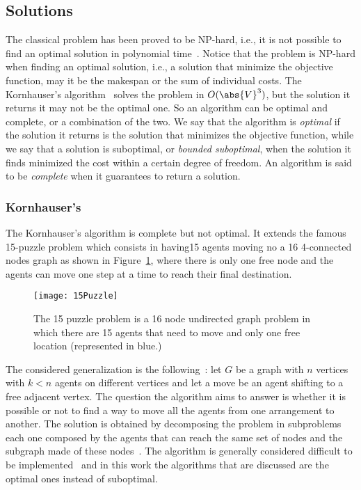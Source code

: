 \subsection{Solutions}
The classical  problem has been proved to be NP-hard, i.e., it is 
not possible to find an optimal solution in polynomial
time~\cite{lavalle,MAPFNPHARD,MAPFIntractable}. Notice that the problem is
NP-hard when finding an optimal solution, i.e., a solution that minimize the
objective function, may it be the makespan or the sum of individual costs. The
Kornhauser's algorithm~\cite{kornhauser} solves the  problem in
$O(\abs{V}^3)$, but the solution it returns it may not be the optimal one.
\newline
So an algorithm can be optimal and complete, or a combination of the two. We
say that the algorithm is \textit{optimal} if the solution it returns is the 
solution that minimizes the objective function, while we say that a solution is
suboptimal, or \textit{bounded suboptimal}, when the solution it finds 
minimized the cost within a certain degree of freedom. An algorithm is said to 
be \textit{complete} when it guarantees to return a solution.
%
\subsubsection{Kornhauser's}
The Kornhauser's algorithm is complete but not optimal. It extends the famous
15-puzzle problem which consists in having15 agents moving no a 16 4-connected
nodes graph as shown in Figure~\ref{fig:15Puzzle}, where there is only one free
node and the agents can move one step at a time to reach their final
destination.
\begin{figure}[t]
  \centering
  \texttt{[image: 15Puzzle]}
  \caption{The 15 puzzle problem is a 16 node undirected graph problem in which
  there are 15 agents that need to move and only one free location
  (represented in blue.)}
  \label{fig:15Puzzle}
\end{figure}\newline
The considered generalization is the following~\cite{kornhauser}: let $G$ be a 
graph with $n$ vertices with $k<n$ agents on different vertices and let a move
be an agent shifting to a free adjacent vertex. The question the algorithm aims
to answer is whether it is possible or not to find a way to move all the agents
from one arrangement to another. The solution is obtained by decomposing the
problem in subproblems each one composed by the agents that can reach the same
set of nodes and the subgraph made of these nodes~\cite{pebble}. \newline 
The algorithm is generally considered difficult to be 
implemented~\cite{MAPF_overview} and in this work the algorithms that are
discussed are the optimal ones instead of suboptimal. 
%
